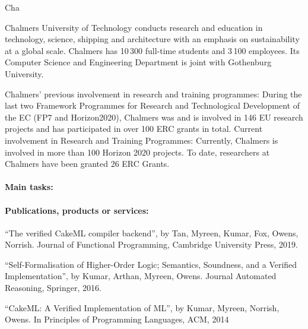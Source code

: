 \begin{sitedescription}{Cha}


Chalmers University of Technology conducts research and education in
technology, science, shipping and architecture with an emphasis on
sustainability at a global scale. Chalmers has 10\,300 full-time
students and 3\,100 employees.  Its Computer Science and Engineering
Department is joint with Gothenburg University.

Chalmers' previous involvement in research and training programmes:
During the last two Framework Programmes for Research and
Technological Development of the EC (FP7 and Horizon2020), Chalmers
was and is involved in 146 EU research projects and has participated
in over 100 ERC grants in total.  Current involvement in Research and
Training Programmes: Currently, Chalmers is involved in more than 100
Horizon 2020 projects.  To date, researchers at Chalmers have been
granted 26 ERC Grants.

\paragraph*{Main tasks:}


\begin{compactitem}
\item
\end{compactitem}

\paragraph*{Publications, products or services:}

\begin{compactitem}
\item
  ``The verified CakeML compiler backend'',
  by Tan, Myreen, Kumar, Fox, Owens, Norrish.
  Journal of Functional Programming, Cambridge University Press, 2019.
\item
  ``Self-Formalisation of Higher-Order Logic;
  Semantics, Soundness, and a Verified Implementation'',
  by Kumar, Arthan, Myreen, Owens.
  Journal Automated Reasoning, Springer, 2016.
\item
  ``CakeML: A Verified Implementation of ML'',
  by Kumar, Myreen, Norrish, Owens.
  In Principles of Programming Languages, ACM, 2014
\end{compactitem}


\end{sitedescription}
